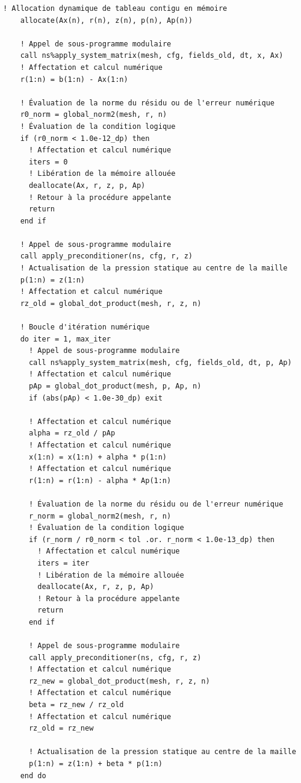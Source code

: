 \documentclass[10pt,a4paper,oneside]{book}
\begin{document}
\begin{lstlisting}[language={[95]Fortran}]
    ! Allocation dynamique de tableau contigu en mémoire
    allocate(Ax(n), r(n), z(n), p(n), Ap(n))

    ! Appel de sous-programme modulaire
    call ns%apply_system_matrix(mesh, cfg, fields_old, dt, x, Ax)
    ! Affectation et calcul numérique
    r(1:n) = b(1:n) - Ax(1:n)

    ! Évaluation de la norme du résidu ou de l'erreur numérique
    r0_norm = global_norm2(mesh, r, n)
    ! Évaluation de la condition logique
    if (r0_norm < 1.0e-12_dp) then
      ! Affectation et calcul numérique
      iters = 0
      ! Libération de la mémoire allouée
      deallocate(Ax, r, z, p, Ap)
      ! Retour à la procédure appelante
      return
    end if

    ! Appel de sous-programme modulaire
    call apply_preconditioner(ns, cfg, r, z)
    ! Actualisation de la pression statique au centre de la maille
    p(1:n) = z(1:n)
    ! Affectation et calcul numérique
    rz_old = global_dot_product(mesh, r, z, n)

    ! Boucle d'itération numérique
    do iter = 1, max_iter
      ! Appel de sous-programme modulaire
      call ns%apply_system_matrix(mesh, cfg, fields_old, dt, p, Ap)
      ! Affectation et calcul numérique
      pAp = global_dot_product(mesh, p, Ap, n)
      if (abs(pAp) < 1.0e-30_dp) exit

      ! Affectation et calcul numérique
      alpha = rz_old / pAp
      ! Affectation et calcul numérique
      x(1:n) = x(1:n) + alpha * p(1:n)
      ! Affectation et calcul numérique
      r(1:n) = r(1:n) - alpha * Ap(1:n)

      ! Évaluation de la norme du résidu ou de l'erreur numérique
      r_norm = global_norm2(mesh, r, n)
      ! Évaluation de la condition logique
      if (r_norm / r0_norm < tol .or. r_norm < 1.0e-13_dp) then
        ! Affectation et calcul numérique
        iters = iter
        ! Libération de la mémoire allouée
        deallocate(Ax, r, z, p, Ap)
        ! Retour à la procédure appelante
        return
      end if

      ! Appel de sous-programme modulaire
      call apply_preconditioner(ns, cfg, r, z)
      ! Affectation et calcul numérique
      rz_new = global_dot_product(mesh, r, z, n)
      ! Affectation et calcul numérique
      beta = rz_new / rz_old
      ! Affectation et calcul numérique
      rz_old = rz_new

      ! Actualisation de la pression statique au centre de la maille
      p(1:n) = z(1:n) + beta * p(1:n)
    end do


\end{lstlisting}
\end{document}
